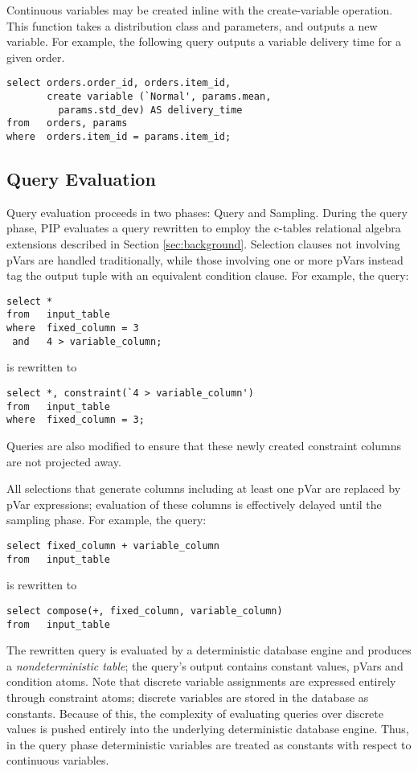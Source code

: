 Continuous variables may be created inline with the create-variable operation.  This function takes a distribution class and parameters, and outputs a new variable.  For example, the following query outputs a variable delivery time for a given order.

\begin{verbatim}
select orders.order_id, orders.item_id,
       create variable (`Normal', params.mean,
         params.std_dev) AS delivery_time
from   orders, params
where  orders.item_id = params.item_id;
\end{verbatim}

\subsection{Query Evaluation}
Query evaluation proceeds in two phases: Query and Sampling.  During the query phase, PIP evaluates a query rewritten to employ the c-tables relational algebra extensions described in Section \ref{sec:background}.  Selection clauses not involving pVars are handled traditionally, while those involving one or more pVars instead tag the output tuple with an equivalent condition clause.  For example, the query:

\begin{verbatim}
select *
from   input_table
where  fixed_column = 3
 and   4 > variable_column;
\end{verbatim}
%
is rewritten to
%
\begin{verbatim}
select *, constraint(`4 > variable_column')
from   input_table
where  fixed_column = 3;
\end{verbatim}

Queries are also modified to ensure that these newly created constraint columns are not projected away.

All selections that generate columns including at least one pVar are replaced by pVar expressions; evaluation of these columns is effectively delayed until the sampling phase.  For example, the query:

\begin{verbatim}
select fixed_column + variable_column
from   input_table
\end{verbatim}
%
is rewritten to
%
\begin{verbatim}
select compose(+, fixed_column, variable_column)
from   input_table
\end{verbatim}

The rewritten query is evaluated by a deterministic database engine and produces a \textit{nondeterministic table}; the query's output contains constant values, pVars and condition atoms.   Note that discrete variable assignments are expressed entirely through constraint atoms; discrete variables are stored in the database as constants.  Because of this, the complexity of evaluating queries over discrete values is pushed entirely into the underlying deterministic database engine.  Thus, in the query phase deterministic variables are treated as constants with respect to continuous variables.

